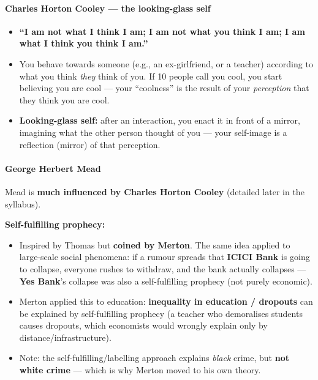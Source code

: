 \paragraph{Charles Horton Cooley --- the looking-glass self}

\begin{KeyConcept}
\begin{itemize}
\item \textbf{``I am not what I think I am; I am not what you think I am; I am what I think you think I am.''}
\item You behave towards someone (e.g., an ex-girlfriend, or a teacher) according to what you think \textit{they} think of you. If 10 people call you cool, you start believing you are cool --- your ``coolness'' is the result of your \textit{perception} that they think you are cool.
\item \textbf{Looking-glass self:} after an interaction, you enact it in front of a mirror, imagining what the other person thought of you --- your self-image is a reflection (mirror) of that perception.
\end{itemize}
\end{KeyConcept}

\paragraph{George Herbert Mead}
Mead is \textbf{much influenced by Charles Horton Cooley} (detailed later in the syllabus).

\begin{KeyConcept}
\textbf{Self-fulfilling prophecy:}
\begin{itemize}
\item Inspired by Thomas but \textbf{coined by Merton}. The same idea applied to large-scale social phenomena: if a rumour spreads that \textbf{ICICI Bank} is going to collapse, everyone rushes to withdraw, and the bank actually collapses --- \textbf{Yes Bank}'s collapse was also a self-fulfilling prophecy (not purely economic).
\item Merton applied this to education: \textbf{inequality in education / dropouts} can be explained by self-fulfilling prophecy (a teacher who demoralises students causes dropouts, which economists would wrongly explain only by distance/infrastructure).
\item Note: the self-fulfilling/labelling approach explains \textit{black} crime, but \textbf{not white crime} --- which is why Merton moved to his own theory.
\end{itemize}
\end{KeyConcept}

